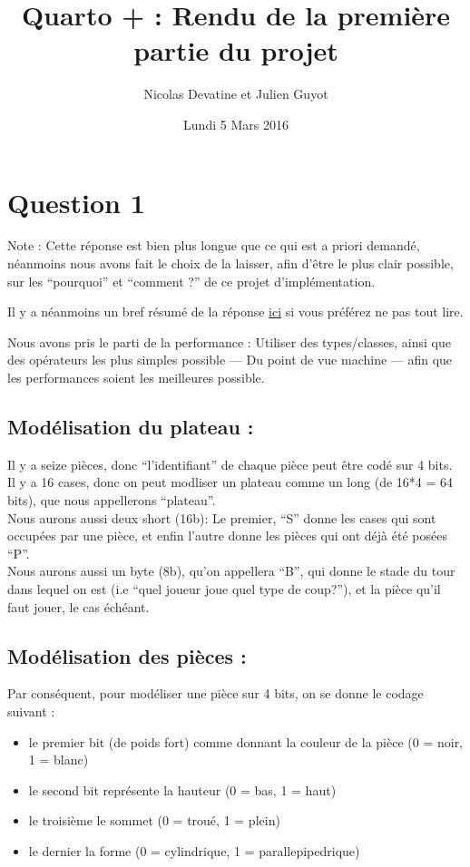 \documentclass{article}
\title{Quarto + : Rendu de la premi\`ere partie du projet}
\author{Nicolas Devatine et Julien Guyot}
\date{Lundi 5 Mars 2016}
\begin{document}
\maketitle
\section{Question 1}


Note : Cette r\'eponse est bien plus longue que ce qui est a priori
demand\'e, n\'eanmoins nous avons fait le choix de la laisser, afin d'\^etre
le plus clair possible, sur les ``pourquoi'' et ``comment ?'' de ce
projet d'impl\'ementation.


Il y a n\'eanmoins un bref r\'esum\'e de la r\'eponse
\hyperlink{resume}{ici}
si vous pr\'ef\'erez ne pas tout lire.


Nous avons pris le parti de la performance : Utiliser des types/classes,
ainsi que des op\'erateurs les plus simples possible --- Du point de vue machine
---  afin que les
performances soient les meilleures possible.


\subsection{Mod\'elisation du plateau :}
Il y a seize pi\`eces, donc ``l'identifiant'' de chaque pi\`ece peut \^etre
cod\'e sur 4 bits. \\
Il y a 16 cases, donc on peut modliser un plateau comme un long (de
16*4 = 64 bits), que nous appellerons ``plateau''.\\
Nous aurons aussi deux short (16b): Le premier, ``S'' donne les cases qui sont occup\'ees par
une pi\`ece, et enfin l'autre
donne les pi\`eces qui ont d\'ej\`a \'et\'e pos\'ees ``P''. \\
Nous aurons aussi un byte (8b), qu'on appellera ``B'', qui donne le
stade du tour dans lequel on est (i.e ``quel joueur joue quel type de
coup?''), et la
pi\`ece qu'il faut jouer, le cas \'ech\'eant.


\subsection{Mod\'elisation des pi\`eces :} Par cons\'equent, pour
mod\'eliser une pi\`ece sur 4 bits, on se donne le codage suivant :\\
\begin{itemize}
\item le premier bit (de poids fort) comme donnant la couleur de
  la pi\`ece (0 = noir, 1 = blanc)  
\item le second bit repr\'esente la hauteur (0 = bas, 1 = haut)
\item le troisi\`eme le sommet (0 = trou\'e, 1 = plein)
\item le dernier la forme (0 = cylindrique, 1 = parallepipedrique)
\end{itemize}
\end{document}
